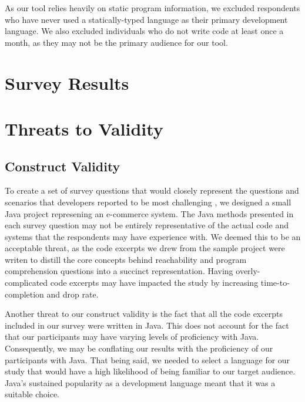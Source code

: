 \par As our tool relies heavily on static program information, we excluded
respondents who have never used a statically-typed language as their primary
development language. 
We also excluded individuals who do not write code at least once a month,
as they may not be the primary audience for our tool.

\section{Survey Results}
\label{sec:SurveyResults}


\section{Threats to Validity}
\label{sec:ThreatsToValidity}


\subsection{Construct Validity}
\label{subsec:ConstructValidity}

\noindent To create a set of survey questions that would closely represent the
questions and scenarios that developers reported to be most challenging
\cite{latoza-2010-hard-questions, latoza-2010-reach}, we designed a small Java
project represening an e-commerce system.
The Java methods presented in each survey question may not be entirely
representative of the actual code and systems that the respondents may have
experience with.
We deemed this to be an acceptable threat, as the code excerpts we drew from
the sample project were writen to distill the core concepts behind
reachability and program comprehension questions into a succinct representation.
Having overly-complicated code excerpts may have impacted the study by
increasing time-to-completion and drop rate.

\par Another threat to our construct validity is the fact that all the code
excerpts included in our survey were written in Java.
This does not account for the fact that our participants may have varying
levels of proficiency with Java.
Consequently, we may be conflating our results with the proficiency of our
participants with Java.
That being said, we needed to select a language for our study that would
have a high likelihood of being familiar to our target audience.
Java's sustained popularity as a development language meant that it was a
suitable choice.

\endinput

TODO: I need a citation for how popular Java is. Tiobe could work; ask Gail?

